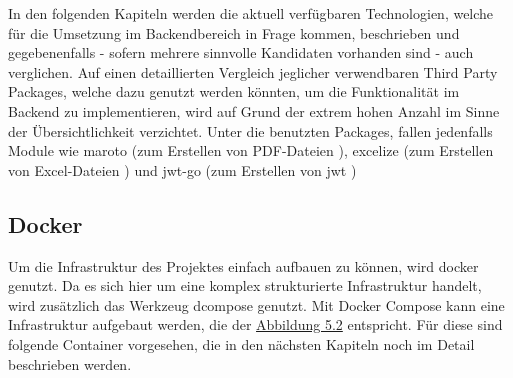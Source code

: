 	\newpage
	In den folgenden Kapiteln werden die aktuell verfügbaren Technologien, welche für die Umsetzung im Backendbereich in Frage kommen, beschrieben und gegebenenfalls - sofern mehrere sinnvolle Kandidaten vorhanden sind - auch verglichen. Auf einen detaillierten Vergleich jeglicher verwendbaren Third Party Packages, welche dazu genutzt werden könnten, um die Funktionalität im Backend zu implementieren, wird auf Grund der extrem hohen Anzahl im Sinne der Übersichtlichkeit verzichtet. Unter die benutzten Packages, fallen jedenfalls Module wie maroto (zum Erstellen von PDF-Dateien \cite{maroto}), excelize (zum Erstellen von Excel-Dateien \cite{excelize}) und jwt-go (zum Erstellen von \Gls{jwt} \cite{jwt-go}) 
	\subsection{Docker}
	Um die Infrastruktur des Projektes einfach aufbauen zu können, wird \Gls{docker} genutzt. Da es sich hier um eine komplex strukturierte Infrastruktur handelt, wird zusätzlich das Werkzeug \Gls{dcompose} genutzt. Mit Docker Compose kann eine Infrastruktur aufgebaut werden, die der \hyperref[fig:uebersicht]{Abbildung 5.2} entspricht. Für diese sind folgende Container vorgesehen, die in den nächsten Kapiteln noch im Detail beschrieben werden.
